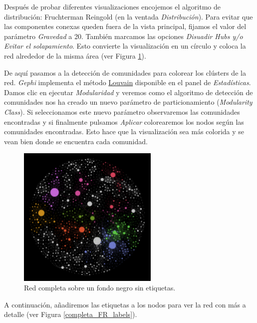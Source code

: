 \documentclass{uimppracticas}
\begin{document}
Después de probar diferentes visualizaciones encojemos el algoritmo de distribución: Fruchterman Reingold (en la ventada \textit{Distribución}). Para evitar que las componentes conexas queden fuera de la vista principal, fijamos el valor del parámetro \textit{Gravedad} a 20. También marcamos las opciones \textit{Disuadir Hubs y/o Evitar el solapamiento}. Esto convierte la visualización en un círculo y coloca la red alrededor de la misma área (ver Figura \ref{completa_negro_FR}). 

De aquí pasamos a la detección de comunidades para colorear los clústers de la red. \textit{Gephi} implementa el método \href{https://es.wikipedia.org/wiki/M\%C3\%A9todo_de_Louvain}{Louvain} disponible en el panel de \textit{Estadísticas}. Damos clic en ejecutar \textit{Modularidad} y veremos como el algoritmo de detección de comunidades nos ha creado un nuevo parámetro de particionamiento (\textit{Modularity Class}). Si seleccionamos este nuevo parámetro observaremos las comunidades encontradas y si finalmente pulsamos \textit{Aplicar} colorearemos los nodos según las comunidades encontradas. Esto hace que la visualización sea más colorida y se vean bien donde se encuentra cada comunidad.

\begin{figure}[h]
	\centering
	\includegraphics[width=0.6\textwidth]{images/completa_negro_FR}
	\caption{Red completa sobre un fondo negro sin etiquetas.}
	\label{completa_negro_FR}
\end{figure}

A continuación, añadiremos las etiquetas a los nodos para ver la red con más a detalle (ver Figura \ref{completa_FR_labels}). 
\end{document}
